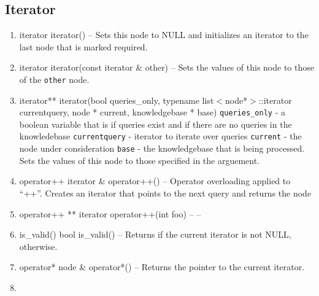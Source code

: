 \subsection{Iterator}
\begin{enumerate}
\item \begin{detail}
{iterator}
{iterator()}
{--}
{Sets this node to NULL and initializes an iterator to the last node that is marked required. } 
\end{detail}
\item \begin{detail}
{iterator}
{iterator(const iterator \& other)}
{--}
{Sets the values of this node to those of the \texttt{other} node.} 
\end{detail}
\item \begin{detail}
{iterator**}
{iterator(bool queries\_only, typename list$<$node*$>$::iterator currentquery, node * current, knowledgebase * base)}
{\texttt{queries\_only} - a boolean variable that is \true if queries exist and \false if there are no queries in the knowledebase
 \texttt{currentquery} - iterator to iterate over queries
 \texttt{current} - the node under consideration
 \texttt{base} - the knowledgebase that is being processed.}
{Sets the values of this node to those specified in the arguement.} 
\end{detail}
\item \begin{detail}
{operator++}
{iterator \& operator++()}
{--}
{Operator overloading applied to ``++''. Creates an iterator that points to the next query and returns the node} 
\end{detail}
\item \begin{detail}
{operator++ **}
{iterator operator++(int foo)}
{--}
{--} 
\end{detail}
\item \begin{detail}
{is\_valid()}
{bool is\_valid()}
{--}
{Returns \true if the current iterator is not NULL, \false otherwise.} 
\end{detail}
\item \begin{detail}
{operator*}
{node \& operator*()}
{--}
{Returns the pointer to the current iterator.} 
\end{detail}
\item \begin{detail}

\end{detail}
\end{enumerate}
